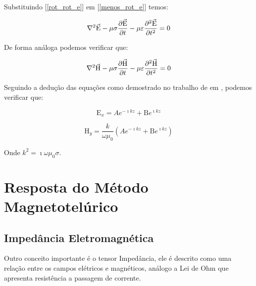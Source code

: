             Substituindo [\ref{rot_rot_e}] em [\ref{menos_rot_e}] temos:
            
            \begin{equation}
             \nabla^2 \vec{\textrm{E}} - \mu \sigma \dfrac{\partial \vec{\textrm{E}}}{\partial t} - \mu \varepsilon \dfrac{\partial^2 \vec{\textrm{E}}}{\partial t^2} = 0
            \end{equation}
            
            De forma análoga podemos verificar que:
            
            \begin{equation}
             \nabla^2 \vec{\textrm{H}} - \mu \sigma \dfrac{\partial \vec{\textrm{H}}}{\partial t} - \mu \varepsilon \dfrac{\partial^2 \vec{\textrm{H}}}{\partial t^2} = 0
            \end{equation}

            Seguindo a dedução das equações como demostrado no trabalho de \citeauthor{didana2010} em \citeyearpar{didana2010}, podemos verificar que:
            
            \begin{equation}
            \label{Ex_AB}
             \textrm{E}_x = A e^{-\imath k z} + \textrm{B} e^{\imath k z}
            \end{equation}
            
            \begin{equation}
            \label{Hy_AB}
             \textrm{H}_y = \dfrac{k}{\omega \mu_0} (A e^{-\imath k z} + \textrm{B} e^{\imath k z})
            \end{equation}

            Onde $k^2 = \imath \omega \mu_0 \sigma$.

 
    
    
    
    \section{Resposta do Método Magnetotelúrico}
        \subsection{Impedância Eletromagnética}
        \label{subsec-Impedancia}
        Outro conceito importante é o tensor Impedância, ele é descrito como uma
	    relação entre os campos elétricos e magnéticos, análogo a Lei de Ohm \cite{eletromag8hayt}
	    que apresenta resistência a passagem de corrente.
	    
